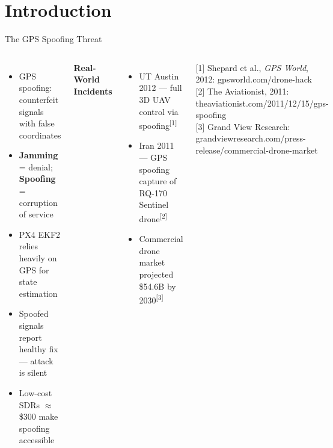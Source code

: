 \documentclass[11pt]{beamer}
\begin{document}
\section{Introduction}
\begin{frame}{The GPS Spoofing Threat}
\begin{columns}[T]
\begin{itemize}\footnotesize
    \item GPS spoofing: counterfeit signals with false coordinates
    \item \textbf{Jamming} = denial; \textbf{Spoofing} = corruption of service
    \item PX4 EKF2 relies heavily on GPS for state estimation
    \item Spoofed signals report healthy fix — attack is silent
    \item Low-cost SDRs $\approx$\$300 make spoofing accessible
\end{itemize}
\vspace{2mm}
\textbf{\footnotesize Real-World Incidents}
\begin{itemize}\footnotesize
    \item UT Austin 2012 — full 3D UAV control via spoofing\textsuperscript{[1]}
    \item Iran 2011 — GPS spoofing capture of RQ-170 Sentinel drone\textsuperscript{[2]}
    \item Commercial drone market projected \$54.6B by 2030\textsuperscript{[3]}
\end{itemize}
\vspace{1mm}
{\tiny
\textcolor{gray!70!black}{[1] Shepard et al., \textit{GPS World}, 2012: gpsworld.com/drone-hack} \\
\textcolor{gray!70!black}{[2] The Aviationist, 2011: theaviationist.com/2011/12/15/gps-spoofing} \\
\textcolor{gray!70!black}{[3] Grand View Research: grandviewresearch.com/press-release/commercial-drone-market}
}

\end{columns}
\end{frame}
\end{document}
